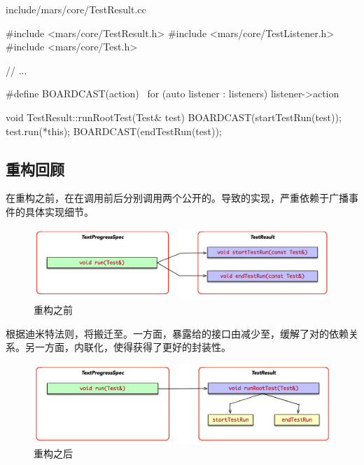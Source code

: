 \begin{content}
\begin{nodiff}{include/mars/core/TestResult.cc}
 \begin{c++}
#include <mars/core/TestResult.h>
#include <mars/core/TestListener.h>
#include <mars/core/Test.h>

// ...

#define BOARDCAST(action) \
  for (auto listener : listeners) listener->action

void TestResult::runRootTest(Test& test) {
  BOARDCAST(startTestRun(test));
  test.run(*this);
  BOARDCAST(endTestRun(test));
}
 \end{c++}
\end{nodiff}

\subsection{重构回顾}

在重构之前，在在调用前后分别调用两个公开的。导致的实现，严重依赖于广播事件的具体实现细节。

\begin{figure}[H]
\centering
\includegraphics[width=1.0\textwidth]{figures/xunit/coupling-3.png}
\caption{重构之前}
 \label{fig:coupling-3}
\end{figure}

根据迪米特法则，将搬迁至。一方面，暴露给的接口由减少至，缓解了对的依赖关系。另一方面，内联化，使得获得了更好的封装性。

\begin{figure}[H]
\centering
\includegraphics[width=1.0\textwidth]{figures/xunit/decoupling-3.png}
\caption{重构之后}
 \label{fig:decoupling-3.png}
\end{figure}


\end{content}
